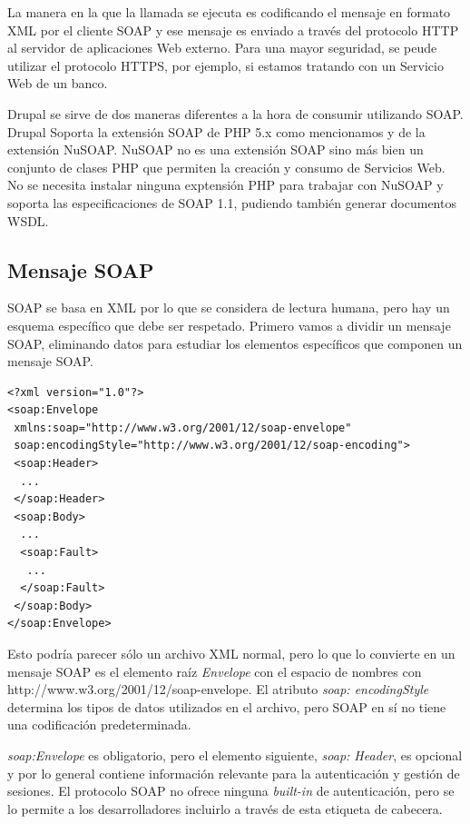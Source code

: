 La manera en la que la llamada se ejecuta es codificando el mensaje en formato XML por el cliente SOAP y 
ese mensaje es enviado a través del protocolo HTTP al servidor de aplicaciones Web externo. Para una mayor 
seguridad, se peude utilizar el protocolo HTTPS, por ejemplo, si estamos tratando con un Servicio Web de un banco.
   
Drupal se sirve de dos maneras diferentes a la hora de consumir utilizando SOAP. Drupal Soporta la extensión SOAP  
de PHP 5.x como mencionamos y de la extensión NuSOAP. NuSOAP no es una extensión SOAP sino más bien un conjunto 
de clases PHP que permiten la creación y consumo de Servicios Web. No se necesita instalar ninguna exptensión PHP 
para trabajar con NuSOAP y soporta las especificaciones de SOAP 1.1, pudiendo también generar documentos WSDL.


\subsection{Mensaje SOAP}

SOAP se basa en XML por lo que se considera de lectura humana, pero hay un esquema específico que debe 
ser respetado. Primero vamos a dividir un mensaje SOAP, eliminando datos para estudiar los elementos 
específicos que componen un mensaje SOAP.

\begin{verbatim}
<?xml version="1.0"?>
<soap:Envelope
 xmlns:soap="http://www.w3.org/2001/12/soap-envelope"
 soap:encodingStyle="http://www.w3.org/2001/12/soap-encoding">
 <soap:Header>
  ...
 </soap:Header>
 <soap:Body>
  ...
  <soap:Fault>
   ...
  </soap:Fault>
 </soap:Body>
</soap:Envelope>
\end{verbatim}

Esto podría parecer sólo un archivo XML normal, pero lo que lo convierte en un mensaje SOAP es el elemento 
raíz \textit{Envelope} con el espacio de nombres con http://www.w3.org/2001/12/soap-envelope. El atributo 
\textit{soap: encodingStyle} determina los tipos de datos utilizados en el archivo, pero SOAP en sí no 
tiene una codificación predeterminada.

\textit{soap:Envelope} es obligatorio, pero el elemento siguiente, \textit{soap: Header}, es opcional y 
por lo general contiene información relevante para la autenticación y gestión de sesiones. 
El protocolo SOAP no ofrece ninguna \textit{built-in} de autenticación, pero se lo permite a los desarrolladores 
incluirlo a través de esta etiqueta de cabecera.

